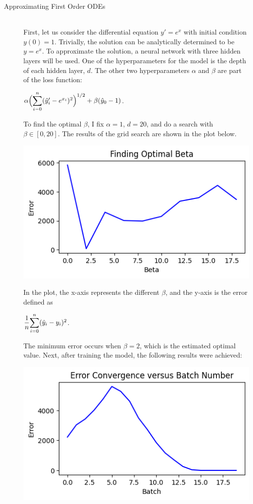 \documentclass[12pt]{article}
\newcommand{\dsum}[2]{\mathlarger{\sum}_{#1}^{#2}}
\newcommand{\bgc}{\begin{center}}
\newcommand{\enc}{\end{center}}
\begin{document}
\begin{description}
    \item[Approximating First Order ODEs] \hfill \\
    First, let us consider the differential equation $y' = e^x$ with initial
    condition $y(0) = 1$. Trivially, the solution can be analytically
    determined to be $y = e^x$. To approximate the solution, a neural network
    with three hidden layers will be used. One of the hyperparameters for the
    model is the depth of each hidden layer, $d$. The other two hyperparameters
    $\alpha$ and $\beta$ are part of the loss function:
    \bgc 
    $\alpha\Bigl(\dsum{i-0}{n}(\hat{y}_i' -e^{x_i})^2\Bigr)^{1/2} + \beta(\hat{y}_0 - 1)$.
    \enc
    To find the optimal $\beta$, I fix $\alpha = 1$, $d = 20$, and do a search with
    $\beta\in[0, 20]$. The results of the grid search are shown in the plot
    below.\\
    \begin{minipage}{\linewidth}
        \centering
        \includegraphics[scale=.5]{images/figure1.png}
    \end{minipage}
    In the plot, the x-axis represents the different $\beta$, and the y-axis is
    the error defined as 
    \bgc 
    $\dfrac{1}{n}\dsum{i=0}{n}(\hat{y}_i - y_i)^2$.
    \enc
    The minimum error occurs when $\beta = 2$, which is the estimated optimal
    value. Next, after training the model, the following results were achieved: \\
    \begin{minipage}{\linewidth}
        \centering
        \includegraphics[scale=.5]{images/figure2.png}

\end{minipage}
\end{description}
\end{document}
